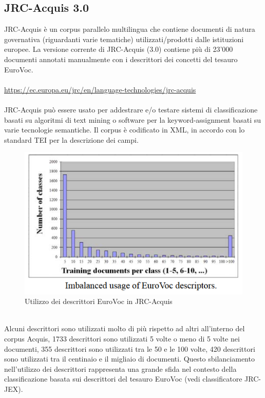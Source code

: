 \documentclass{article}
\theoremstyle{plain}
\theoremstyle{definition}
\begin{document}
\subsection{JRC-Acquis 3.0}
JRC-Acquis è un corpus parallelo multilingua che contiene documenti di natura governativa (riguardanti varie tematiche) utilizzati/prodotti dalle istituzioni europee.  
La versione corrente di JRC-Acquis (3.0) contiene più di 23'000 documenti annotati manualmente con i descrittori dei concetti del tesauro EuroVoc. 
\\
\\
\url{https://ec.europa.eu/jrc/en/language-technologies/jrc-acquis}
\\
\\
JRC-Acquis può essere usato per addestrare e/o testare sistemi di classificazione basati su algoritmi di text mining o software per la keyword-assignment basati su varie tecnologie semantiche. Il corpus è codificato in XML, in accordo con lo standard TEI per la descrizione dei campi.
\footnotemark
{}
\begin{figure}[htbp]
\begin{center}
\includegraphics[scale=1.00]{img/evocimbalanced.png}
\caption{Utilizzo dei descrittori EuroVoc in JRC-Acquis}
\end{center}
\end{figure}
\phantom
\\
Alcuni descrittori sono utilizzati molto di più rispetto ad altri all'interno del corpus Acquis, 1733 descrittori sono utilizzati 5 volte o meno di 5 volte nei documenti, 355 descrittori sono utilizzati tra le 50 e le 100 volte, 420 descrittori sono utilizzati tra il centinaio e il migliaio di documenti. Questo sbilanciamento nell'utilizzo dei descrittori rappresenta una grande sfida nel contesto della classificazione basata sui descrittori del tesauro EuroVoc (vedi classificatore JRC-JEX).
\end{document}
